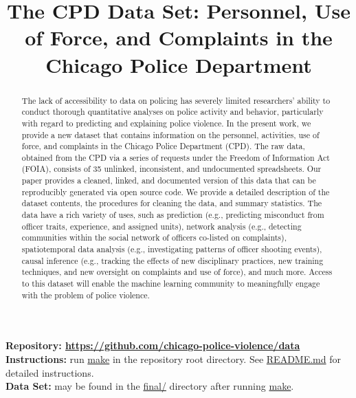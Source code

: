 \documentclass{article}
\title{The CPD Data Set: Personnel, Use of Force, and Complaints in the Chicago Police Department}
\begin{document}
\maketitle

\begin{abstract}
The lack of accessibility to data on policing has severely limited researchers’
ability to conduct thorough quantitative analyses on police activity and
behavior, particularly with regard to predicting and explaining police
violence. In the present work, we provide a new dataset that contains
information on the personnel, activities, use of force, and complaints in the
Chicago Police Department (CPD). The raw data, obtained from the CPD via a
series of requests under the Freedom of Information Act (FOIA), consists of 35
unlinked, inconsistent, and undocumented spreadsheets. Our paper provides a
cleaned, linked, and documented version of this data that can be reproducibly
generated via open source code. We provide a detailed description of the
dataset contents, the procedures for cleaning the data, and summary statistics.
The data have a rich variety of uses, such as prediction (e.g., predicting
misconduct from officer traits, experience, and assigned units), network
analysis (e.g., detecting communities within the social network of officers
co-listed on complaints), spatiotemporal data analysis (e.g., investigating
patterns of officer shooting events), causal inference (e.g., tracking the
effects of new disciplinary practices, new training techniques, and new
oversight on complaints and use of force), and much more. Access to this
dataset will enable the machine learning community to meaningfully engage with
the problem of police violence.
\end{abstract}

\textbf{Repository: \url{https://github.com/chicago-police-violence/data}}\\
\textbf{Instructions:} run \url{make} in the repository root directory. See \url{README.md} for detailed instructions.\\
\textbf{Data Set:} may be found in the \url{final/} directory after running \url{make}.








%
%






\appendix





\end{document}
